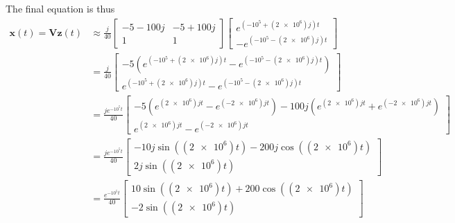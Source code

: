 \documentclass{article}
\begin{document}
The final equation is thus
\begin{align}
    \bm{x}(t) = \bm{V} \bm{z}(t) &\approx
    \frac{j}{40} \begin{bmatrix}
        -5 - 100j & -5 + 100j \\
        1 & 1
    \end{bmatrix}
    \begin{bmatrix}
        e^{(-10^5 + (\num{2e6}) j) t} \\
        -e^{(-10^5 - (\num{2e6}) j) t}
    \end{bmatrix} \\
    &= \frac{j}{40} \begin{bmatrix}
        -5 (e^{(-10^5 + (\num{2e6}) j) t} - e^{(-10^5 - (\num{2e6}) j) t}) \\
        e^{(-10^5 + (\num{2e6}) j) t} - e^{(-10^5 - (\num{2e6}) j) t}
    \end{bmatrix} \\
    &= \frac{je^{-10^5 t}}{40} \begin{bmatrix}
        -5 (e^{(\num{2e6}) j t} - e^{(\num{-2e6}) j t}) - 100j (e^{(\num{2e6}) j t} + e^{(\num{-2e6}) j t}) \\
        e^{(\num{2e6}) j t} - e^{(\num{-2e6}) j t}
    \end{bmatrix} \\
    &= \frac{je^{-10^5 t}}{40} \begin{bmatrix}
        -10j \sin((\num{2e6}) t) - 200j \cos((\num{2e6}) t) \\
        2j \sin((\num{2e6}) t)
    \end{bmatrix} \\
    &= \frac{e^{-10^5 t}}{40} \begin{bmatrix}
        10 \sin((\num{2e6}) t) + 200 \cos((\num{2e6}) t) \\
        -2 \sin((\num{2e6}) t)
    \end{bmatrix}
\end{align}
\end{document}
